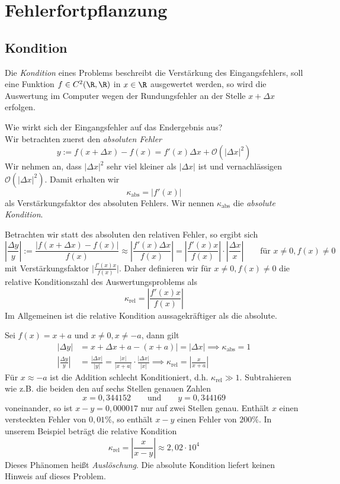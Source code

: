 \documentclass{mycourse}
\newcommand{\kondrel}{\kappa_{\text{rel}}}
\begin{document}
\section{Fehlerfortpflanzung}

\subsection{Kondition}

Die \emph{Kondition} eines Problems beschreibt die Verstärkung des Eingangsfehlers, soll eine Funktion
$f\in C^2(\R,\R)$ in $x\in \R$ ausgewertet werden, so wird die Auswertung im Computer wegen der Rundungsfehler an der Stelle $x+\Delta x$ erfolgen.

Wie wirkt sich der Eingangsfehler auf das Endergebnis aus?\\
Wir betrachten zuerst den \emph{absoluten Fehler}
\[
y:=f(x+\Delta x)-f(x)=f'(x)\Delta x + \mathcal O(|\Delta x|^2)
\]
Wir nehmen an, dass $|\Delta x|^2$ sehr viel kleiner als $|\Delta x|$ ist und vernachlässigen $\mathcal O(|\Delta x|^2)$.
Damit erhalten wir 
\[
	\kappa_{\text{abs}}=|f'(x)|
\]
als Verstärkungsfaktor des absoluten Fehlers.
Wir nennen $\kappa_{\text{abs}}$ die \emph{absolute Kondition}.

Betrachten wir statt des absoluten den relativen Fehler, so ergibt sich
\[
\left|\frac{\Delta y}{y}\right| := \frac{|f(x+\Delta x)-f(x)|}{f(x)}\approx \left|\frac{f'(x)\Delta x}{f(x)}\right|
= \left|\frac{f'(x)x}{f(x)}\right|\cdot \left|\frac{\Delta x}{x}\right|
\qquad \text{für } x\neq 0, f(x)\neq 0
\]
mit Verstärkungsfaktor $\big|\frac{f'(x)x}{f(x)}\big|$.
Daher definieren wir für $x\neq 0, f(x)\neq0$ die relative Konditionszahl des Auswertungsproblems als
\[
\kappa_{\text{rel}}=\left|\frac{f'(x)x}{f(x)}\right|
\]
Im Allgemeinen ist die relative Kondition aussagekräftiger als die absolute.

\begin{ex}
\label{ex: 2.4}
Sei $f(x)=x+a$ und $x\neq 0, x\neq -a$, dann gilt
\begin{align*}
|\Delta y|
&=x+\Delta x+a-(x+a)|=|\Delta x| \implies \kappa_{\text{abs}}=1\\
\left|\frac {\Delta y}{y}\right|
&=\frac {|\Delta x|}{|y|}
=\frac{|x|}{|x+a|}\cdot \frac{|\Delta x|}{|x|} \implies \kondrel=\left|\frac x{x+a}\right|
\end{align*}
Für $x\approx -a$ ist die Addition schlecht Konditioniert, d.h. $\kondrel \gg 1$.
Subtrahieren wie z.B. die beiden den auf sechs Stellen genauen Zahlen
\[
x=0,344152 \qquad \text{und} \qquad y=0,344169
\]
voneinander, so ist $x-y=0,000017$ nur auf zwei Stellen genau.
Enthält $x$ einen versteckten Fehler von $0,01\%$, so enthält $x-y$ einen Fehler von
$200\%$.
In unserem Beispiel beträgt die relative Kondition
\[
\kondrel = \left|\frac x{x-y}\right| \approx 2,02 \cdot 10^4
\]
Dieses Phänomen heißt \emph{Auslöschung}.
Die absolute Kondition liefert keinen Hinweis auf dieses Problem.
\end{ex}
\end{document}
